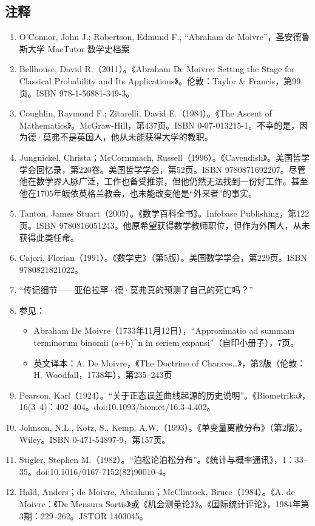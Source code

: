 \subsection{注释}
\begin{enumerate}
\item O'Connor, John J.; Robertson, Edmund F., “Abraham de Moivre”，圣安德鲁斯大学 MacTutor 数学史档案
\item Bellhouse, David R.（2011）。《Abraham De Moivre: Setting the Stage for Classical Probability and Its Applications》。伦敦：Taylor & Francis，第99页。ISBN 978-1-56881-349-3。
\item Coughlin, Raymond F.; Zitarelli, David E.（1984）。《The Ascent of Mathematics》。McGraw-Hill，第437页。ISBN 0-07-013215-1。不幸的是，因为德·莫弗不是英国人，他从未能获得大学的教职。
\item Jungnickel, Christa；McCormmach, Russell（1996）。《Cavendish》。美国哲学学会回忆录，第220卷。美国哲学学会，第52页。ISBN 9780871692207。尽管他在数学界人脉广泛，工作也备受推崇，但他仍然无法找到一份好工作。甚至他在1705年皈依英格兰教会，也未能改变他是“外来者”的事实。
\item Tanton, James Stuart（2005）。《数学百科全书》。Infobase Publishing，第122页。ISBN 9780816051243。他原希望获得数学教师职位，但作为外国人，从未获得此类任命。
\item Cajori, Florian（1991）。《数学史》（第5版）。美国数学学会，第229页。ISBN 9780821821022。
\item “传记细节——亚伯拉罕·德·莫弗真的预测了自己的死亡吗？”
\item 参见：
  \begin{itemize}
  \item Abraham De Moivre（1733年11月12日），“Approximatio ad summam terminorum binomii (a+b)^n in seriem expansi”（自印小册子），7页。
  \item 英文译本：A. De Moivre，《The Doctrine of Chances…》，第2版（伦敦：H. Woodfall，1738年），第235–243页
  \end{itemize}
\item Pearson, Karl（1924）。“关于正态误差曲线起源的历史说明”。《Biometrika》，16(3–4)：402–404。doi:10.1093/biomet/16.3-4.402。
\item Johnson, N.L., Kotz, S., Kemp, A.W.（1993）。《单变量离散分布》（第2版）。Wiley。ISBN 0-471-54897-9，第157页。
\item Stigler, Stephen M.（1982）。“泊松论泊松分布”。《统计与概率通讯》，1：33–35。doi:10.1016/0167-7152(82)90010-4。
\item Hald, Anders；de Moivre, Abraham；McClintock, Bruce（1984）。《A. de Moivre：《De Mensura Sortis》或《机会测量论》》。《国际统计评论》，1984年第3期：229–262。JSTOR 1403045。


\end{enumerate}
